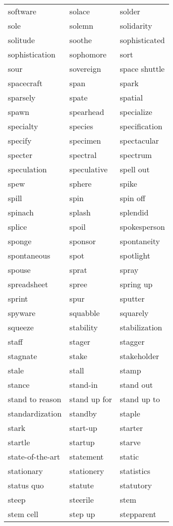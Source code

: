 \documentclass{minimal}
\begin{document}
\begin{longtable}{p{2.7cm}@{\hskip 0.2cm}p{2.7cm}@{\hskip 0.2cm}p{2.7cm}}
software & solace & solder \\
sole & solemn & solidarity \\
solitude & soothe & sophisticated \\
sophistication & sophomore & sort \\
sour & sovereign & space shuttle \\
spacecraft & span & spark \\
sparsely & spate & spatial \\
spawn & spearhead & specialize \\
specialty & species & specification \\
specify & specimen & spectacular \\
specter & spectral & spectrum \\
speculation & speculative & spell out \\
spew & sphere & spike \\
spill & spin & spin off \\
spinach & splash & splendid \\
splice & spoil & spokesperson \\
sponge & sponsor & spontaneity \\
spontaneous & spot & spotlight \\
spouse & sprat & spray \\
spreadsheet & spree & spring up \\
sprint & spur & sputter \\
spyware & squabble & squarely \\
squeeze & stability & stabilization \\
staff & stager & stagger \\
stagnate & stake & stakeholder \\
stale & stall & stamp \\
stance & stand-in & stand out \\
stand to reason & stand up for & stand up to \\
standardization & standby & staple \\
stark & start-up & starter \\
startle & startup & starve \\
state-of-the-art & statement & static \\
stationary & stationery & statistics \\
status quo & statute & statutory \\
steep & steerile & stem \\
stem cell & step up & stepparent \\

\end{longtable}
\end{document}
